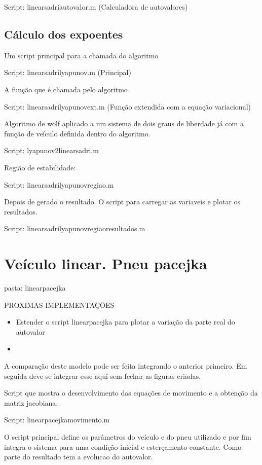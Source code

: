 \documentclass[sublist]{fei}
\begin{document}
Script: linearsadriautovalor.m (Calculadora de autovalores)

\section{Cálculo dos expoentes}

Um script principal para a chamada do algoritmo

Script: linearsadrilyapunov.m (Principal)

A função que é chamada pelo algoritmo

Script: linearsadrilyapunovext.m (Função extendida com a equação variacional)

Algoritmo de wolf aplicado a um sistema de dois graus de liberdade já com a função de veículo definida dentro do algoritmo.

Script: lyapunov2linearsadri.m

Região de estabilidade:

Script: linearsadrilyapunovregiao.m

Depois de gerado o resultado. O script para carregar as variaveis e plotar os resultados.

Script: linearsadrilyapunovregiaoresultados.m

\chapter{Veículo linear. Pneu pacejka} 

pasta: linearpacejka

PROXIMAS IMPLEMENTAÇÕES

\begin{itemize}
\item Estender o script linearpacejka para plotar a variação da parte real do autovalor
\item 
\end{itemize}


A comparação deste modelo pode ser feita integrando o anterior primeiro. Em seguida deve-se integrar esse aqui sem fechar as figuras criadas.

Script que mostra o desenvolvimento das equações de movimento e a obtenção da matriz jacobiana. 

Script: linearpacejkamovimento.m

O script principal define os parâmetros do veículo e do pneu utilizado e por fim integra o sistema para uma condição inicial e esterçamento constante. Como parte do resultado tem a evolucao do autovalor.
\end{document}
